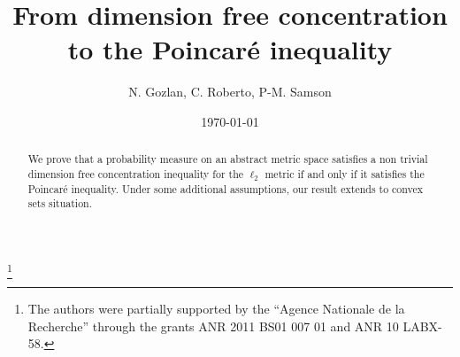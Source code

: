 \documentclass[11pt]{amsart}
\numberwithin{equation}{section}
\begin{document}
\title[From dimension free concentration to the Poincar\'e inequality]
{From dimension free concentration to the Poincar\'e inequality}
\author{N. Gozlan, C. Roberto, P-M. Samson}

\date{\today}

\address{Universit\'e Paris Est Marne la Vall\'ee - Laboratoire d'Analyse et de Math\'e\-matiques Appliqu\'ees (UMR CNRS 8050), 5 bd Descartes, 77454 Marne la Vall\'ee Cedex 2, France}

\address{Universit\'e Paris Ouest Nanterre la D\'efense, MODAL'X, EA 3454, 200 avenue de la R\'epublique 92000 Nanterre, France}


\thanks{The authors were partially supported by the ``Agence Nationale de la Recherche'' through the grants ANR 2011 BS01 007 01 and  ANR 10 LABX-58.}


\begin{abstract}
We prove that a probability measure on an abstract metric space satisfies a non trivial dimension free concentration inequality for the $\ell_2$ metric if and only if it satisfies the Poincar\'e inequality.
Under some additional assumptions, our result extends to convex sets situation.
\end{abstract}
\maketitle
\end{document}
